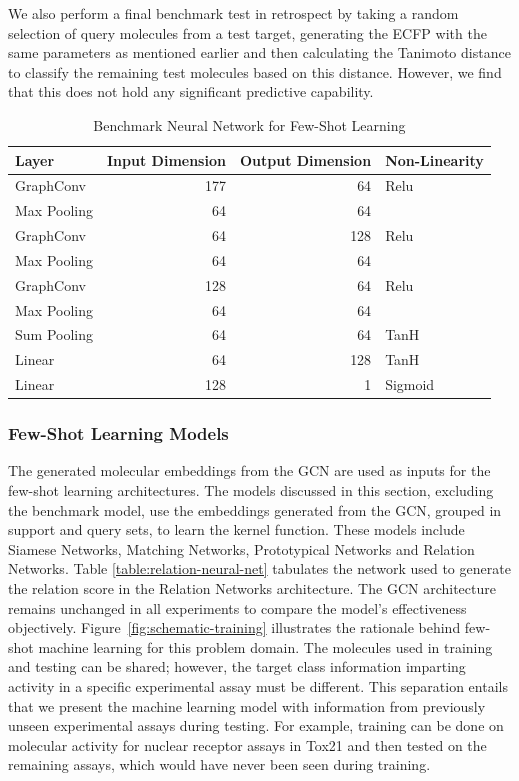 We also perform a final benchmark test in retrospect by taking a random selection of query molecules from a test target, generating the ECFP with the same parameters as mentioned earlier and then calculating the Tanimoto distance to classify the remaining test molecules based on this distance. However, we find that this does not hold any significant predictive capability. 

\begin{table}
    \centering
    \begin{tabular}{@{}lrrl@{}}
    \hline
    \textbf{Layer} & \textbf{Input Dimension} & \textbf{Output Dimension} & \textbf{Non-Linearity} \\
    \hline
    GraphConv   & 177   & 64    & Relu \\
    Max Pooling & 64    & 64    &  \\
    GraphConv   & 64    & 128   & Relu \\
    Max Pooling & 64    & 64    &  \\
    GraphConv   & 128   & 64    & Relu \\
    Max Pooling & 64    & 64    &  \\
    Sum Pooling & 64    & 64    & TanH \\
    Linear      & 64    & 128   & TanH \\
    Linear      & 128   & 1     & Sigmoid \\
    \hline
    \end{tabular}
    \caption{Benchmark Neural Network for Few-Shot Learning}
    \label{table:benchmarkArchi}
\end{table}

\subsubsection{Few-Shot Learning Models}

The generated molecular embeddings from the GCN are used as inputs for the few-shot learning architectures. The models discussed in this section, excluding the benchmark model, use the embeddings generated from the GCN, grouped in support and query sets, to learn the kernel function. These models include Siamese Networks, Matching Networks, Prototypical Networks and Relation Networks. Table \ref{table:relation-neural-net} tabulates the network used to generate the relation score in the Relation Networks architecture. The GCN architecture remains unchanged in all experiments to compare the model's effectiveness objectively. Figure~\ref{fig:schematic-training} illustrates the rationale behind few-shot machine learning for this problem domain. The molecules used in training and testing can be shared; however, the target class information imparting activity in a specific experimental assay must be different. This separation entails that we present the machine learning model with information from previously unseen experimental assays during testing. For example, training can be done on molecular activity for nuclear receptor assays in Tox21 and then tested on the remaining assays, which would have never been seen during training.

